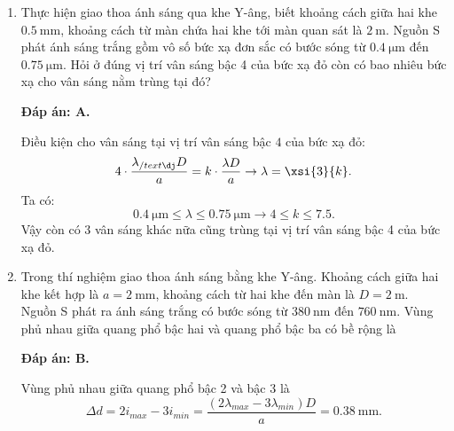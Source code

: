 \begin{enumerate}[label=\bfseries Câu \arabic*:]
	\item {} 
		\cauhoi
	{Thực hiện giao thoa ánh sáng qua khe Y-âng, biết khoảng cách giữa hai khe $\SI{0.5}{\milli \meter}$, khoảng cách từ màn chứa hai khe tới màn quan sát là $\SI{2}{\meter}$. Nguồn S phát ánh sáng trắng gồm vô số bức xạ đơn sắc có bước sóng từ $\SI{0.4}{\micro \meter}$ đến $\SI{0.75}{\micro \meter}$. Hỏi ở đúng vị trí vân sáng bậc 4 của bức xạ đỏ còn có bao nhiêu bức xạ cho vân sáng nằm trùng tại đó?
	}
	
	\loigiai
	{		\textbf{Đáp án: A.}
		
Điều kiện cho vân sáng tại vị trí vân sáng bậc $ 4 $ của bức xạ đỏ:
$$
	4 \cdot \dfrac{\lambda_{/text{đ}} D}{a} = k \cdot \dfrac{\lambda D}{a} \rightarrow \lambda = \xsi{3}{k}.
$$
Ta có:
$$
	\SI{0.4}{\micro \meter} \leq \lambda \leq \SI{0.75}{\micro \meter} \rightarrow \num{4} \leq k \leq \num{7,5}.
$$
Vậy còn có $ 3 $ vân sáng khác nữa cũng trùng tại vị trí vân sáng bậc 4 của bức xạ đỏ.
	}
	
	\item {} 
		\cauhoi
	{Trong thí nghiệm giao thoa ánh sáng bằng khe Y-âng. Khoảng cách giữa hai khe kết hợp là $a=\SI{2}{\milli \meter}$, khoảng cách từ hai khe đến màn là $D=\SI{2}{\meter}$. Nguồn S phát ra ánh sáng trắng có bước sóng từ $\SI{380}{\nano \meter}$ đến $\SI{760}{\nano \meter}$. Vùng phủ nhau giữa quang phổ bậc hai và quang phổ bậc ba có bề rộng là
	}
	
	\loigiai
	{		\textbf{Đáp án: B.}
		
Vùng phủ nhau giữa quang phổ bậc 2 và bậc 3 là
$$
	\Delta d = 2i_{max} - 3i_{min} = \dfrac{(2\lambda_{max} - 3\lambda_{min})D}{a} = \SI{0.38}{\milli \meter}.
$$
		
	}
	
\end{enumerate}



